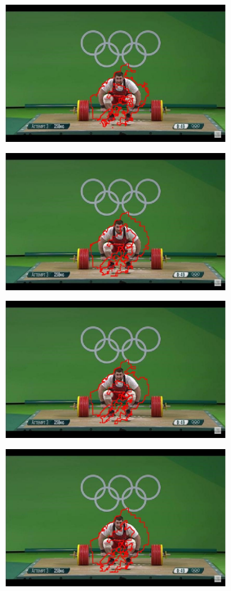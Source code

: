 \documentclass{article}
\begin{document}
	\begin{center}
		\includegraphics[width=100mm]{img/d3}
	\end{center}
	
	\begin{center}
		\includegraphics[width=100mm]{img/d4}
	\end{center}
	
	\begin{center}
		\includegraphics[width=100mm]{img/d5}
	\end{center}
	
	\begin{center}
		\includegraphics[width=100mm]{img/d6}
	\end{center}
\end{document}

